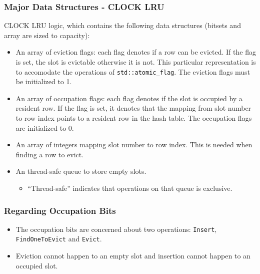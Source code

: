 \documentclass{beamer}
\begin{document}
\begin{frame}
\frametitle{Major Data Structures - CLOCK LRU}
CLOCK LRU logic, which contains the following data structures (bitsets and
 array are sized to capacity):
\begin{itemize}
\item An array of eviction flags: each flag denotes if a row can be evicted. If 
the flag is set, the slot is evictable otherwise it is not. This particular 
representation is to accomodate the operations of \texttt{std::atomic\_flag}. The
eviction flags must be initialized to 1.
\item An array of occupation flags: each flag denotes if the slot is occupied by a
resident row. If the flag is set, it denotes that the mapping from slot number
to row index points to a resident row in the hash table. The occupation flags
are initialized to 0.
\item An array of integers mapping slot number to row index. This is needed when
finding a row to evict.
\item An thread-safe queue to store empty slots.
\begin{itemize}
\item ``Thread-safe'' indicates that operations on that queue is exclusive.
\end{itemize}
\end{itemize}

\end{frame}
\begin{frame}
\frametitle{Regarding Occupation Bits}
\begin{itemize}
\item The occupation bits are concerned about two operations: \texttt{Insert}, 
  \texttt{FindOneToEvict} and \texttt{Evict}.
\item Eviction cannot happen to an empty slot and insertion cannot happen to an 
occupied slot.
\end{itemize}
\end{frame}
\end{document}
